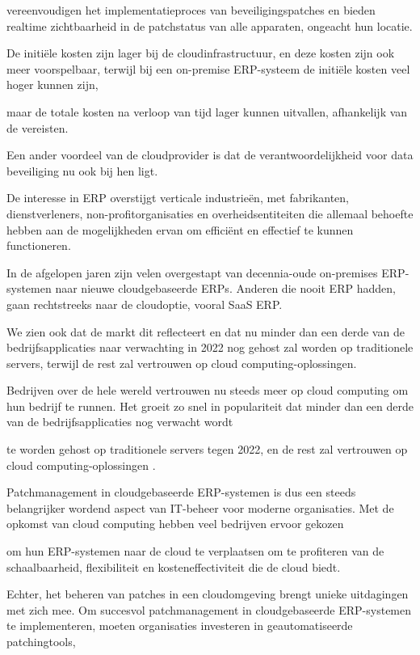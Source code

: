 vereenvoudigen het implementatieproces van beveiligingspatches en bieden realtime zichtbaarheid in de patchstatus van alle apparaten, ongeacht hun locatie.

De initiële kosten zijn lager bij de cloudinfrastructuur, en deze kosten zijn ook meer voorspelbaar, terwijl bij een on-premise ERP-systeem de initiële kosten veel hoger kunnen zijn, 

maar de totale kosten na verloop van tijd lager kunnen uitvallen, afhankelijk van de vereisten. 

Een ander voordeel van de cloudprovider is dat de verantwoordelijkheid voor data beveiliging nu ook bij hen ligt.

De interesse in ERP overstijgt verticale industrieën, met fabrikanten, dienstverleners, non-profitorganisaties en overheidsentiteiten die allemaal behoefte hebben aan de mogelijkheden ervan om efficiënt en effectief te kunnen functioneren.

In de afgelopen jaren zijn velen overgestapt van decennia-oude on-premises ERP-systemen naar nieuwe cloudgebaseerde ERPs. Anderen die nooit ERP hadden, gaan rechtstreeks naar de cloudoptie, vooral SaaS ERP.

We zien ook dat de markt dit reflecteert en dat nu minder dan een derde van de bedrijfsapplicaties naar verwachting in 2022 nog gehost zal worden op traditionele servers, terwijl de rest zal vertrouwen op cloud computing-oplossingen.

Bedrijven over de hele wereld vertrouwen nu steeds meer op cloud computing om hun bedrijf te runnen. Het groeit zo snel in populariteit dat minder dan een derde van de bedrijfsapplicaties nog verwacht wordt 

te worden gehost op traditionele servers tegen 2022, en de rest zal vertrouwen op cloud computing-oplossingen \autocite{Pimentel2017}.

Patchmanagement in cloudgebaseerde ERP-systemen is dus een steeds belangrijker wordend aspect van IT-beheer voor moderne organisaties. Met de opkomst van cloud computing hebben veel bedrijven ervoor gekozen

om hun ERP-systemen naar de cloud te verplaatsen om te profiteren van de schaalbaarheid, flexibiliteit en kosteneffectiviteit die de cloud biedt. 

Echter, het beheren van patches in een cloudomgeving brengt unieke uitdagingen met zich mee.
Om succesvol patchmanagement in cloudgebaseerde ERP-systemen te implementeren, moeten organisaties investeren in geautomatiseerde patchingtools, 

